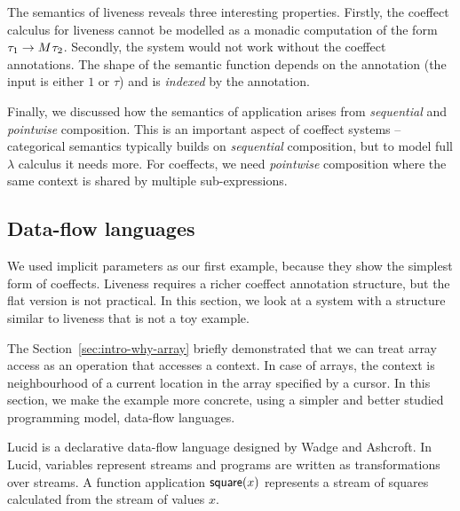 The semantics of liveness reveals three interesting properties. Firstly, the coeffect calculus for
liveness cannot be modelled as a monadic computation of the form $\tau_1 \rightarrow M^{}\tau_2$.
Secondly, the system would not work without the coeffect annotations. 
The shape of the semantic function depends on the annotation (the input is either $1$ or $\tau$) and 
is \emph{indexed} by the annotation. 

Finally, we discussed how the semantics of application arises from \emph{sequential} and 
\emph{pointwise} composition. This is an important aspect of coeffect systems -- categorical 
semantics typically builds on \emph{sequential} composition, but to model full $\lambda$ calculus 
it needs more. For coeffects, we need \emph{pointwise} composition where the same context 
is shared by multiple sub-expressions.


\subsection{Data-flow languages}
\label{sec:applications-flat-dataflow}

We used implicit parameters as our first example, because they show the simplest form of coeffects.
Liveness requires a richer coeffect annotation structure, but the flat version is not practical.
In this section, we look at a system with a structure similar to liveness that is not a toy example.

The Section~\ref{sec:intro-why-array} briefly demonstrated that we can treat array access as an 
operation that accesses a context. In case of arrays, the context is neighbourhood of a current
location in the array specified by a cursor. In this section, we make the example more concrete,
using a simpler and better studied programming model, data-flow languages.

Lucid \cite{app-lucid} is a declarative data-flow language designed by Wadge and Ashcroft. In Lucid, 
variables represent streams and programs are written as transformations over streams. A function 
application $\textnormal{\sffamily square}(x)$ represents a stream of squares calculated from the stream of values $x$.

